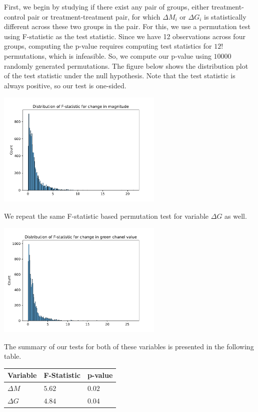 \documentclass[
  12pt,
]{article}
\begin{document}
First, we begin by studying if there exist any pair of groups, either
treatment-control pair or treatment-treatment pair, for which
\(\Delta M_i\) or \(\Delta G_i\) is statistically different across these
two groups in the pair. For this, we use a permutation test using
F-statistic as the test statistic. Since we have 12 observations across
four groups, computing the p-value requires computing test statistics
for \(12!\) permutations, which is infeasible. So, we compute our
p-value using \(10000\) randomly generated permutations. The figure
below shows the distribution plot of the test statistic under the null
hypothesis. Note that the test statistic is always positive, so our test
is one-sided.

\includegraphics[width=300px]{report_files/figure-latex/unnamed-chunk-9-1}

We repeat the same F-statistic based permutation test for variable
\(\Delta G\) as well.

\includegraphics[width=300px]{report_files/figure-latex/unnamed-chunk-10-3}

The summary of our tests for both of these variables is presented in the
following table.

\begin{longtable}[]{@{}lll@{}}
\toprule()
Variable & F-Statistic & p-value \\
\midrule()
\endhead
\(\Delta M\) & \(5.62\) & \(0.02\) \\
\(\Delta G\) & \(4.84\) & \(0.04\) \\
\bottomrule()
\end{longtable}
\end{document}
